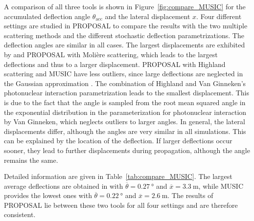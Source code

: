 A comparison of all three tools is shown in Figure~\ref{fig:compare_MUSIC} 
for the 
accumulated deflection angle $\theta_{\text{acc}}$ and the lateral displacement
$x$. 
Four different settings are studied in PROPOSAL to compare the results with 
the two multiple scattering methods and the different stochastic deflection parametrizations.
The deflection angles are 
similar in all cases. The 
largest displacements are exhibited by  and PROPOSAL with Molière scattering, which 
leads to the largest deflections and thus to a larger displacement. 
PROPOSAL with Highland scattering and MUSIC have less outliers, since large 
deflections are neglected in the Gaussian approximation \cite{HIGHLAND_1975}. 
The combination of Highland and 
Van Ginneken's photonuclear interaction parametrization leads to the smallest 
displacement. This is due to the fact that the angle is sampled from the root mean squared angle in the exponential distribution
in the parameterization for photonuclear interaction by Van Ginneken, which neglects 
outliers to larger angles. 
In general, the lateral displacements differ, although the angles are very similar in all simulations. 
This can be explained by the location of the deflection. If larger deflections occur sooner, 
they lead to further displacements during propagation, although the angle remains the same.

Detailed information are given in Table~\ref{tab:compare_MUSIC}. 
The largest average deflections are obtained in  with 
$\overline{\theta} = \SI{0.27}{\degree}$ 
and $\overline{x} = \SI{3.3}{\meter}$, while MUSIC provides the lowest 
ones with $\overline{\theta} = \SI{0.22}{\degree}$ and 
$\overline{x} = \SI{2.6}{\meter}$.
The results of PROPOSAL lie between 
these two tools for all four settings and are therefore consistent. 

